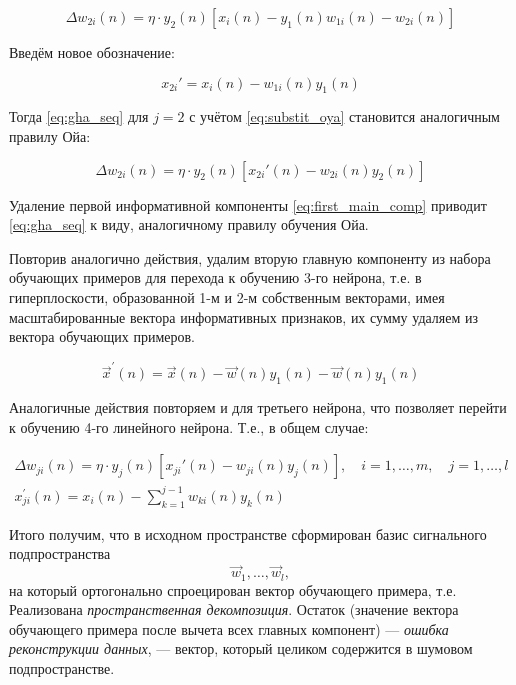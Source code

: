 \documentclass[a4paper]{article}
\numberwithin{equation}{subsection}
\begin{document}
\begin{equation}
    \Delta w_{2i}(n) = \eta \cdot y_2(n) \left[
        x_i(n) - y_1(n) w_{1i}(n) - w_{2i}(n)
    \right]
\end{equation}

Введём новое обозначение:

\begin{equation}
    x_{2i}' = x_i(n) - w_{1i}(n) y_1(n)
    \label{eq:substit_oya}
\end{equation}

Тогда \ref{eq:gha_seq} для $j=2$ с учётом \ref{eq:substit_oya} становится аналогичным правилу Ойа:

\begin{equation}
    \Delta w_{2i}(n) = \eta \cdot y_2(n) 
    \left[
        x_{2i}'(n) - w_{2i}(n) y_2(n)
    \right]
\end{equation}

Удаление первой информативной компоненты \ref{eq:first_main_comp} приводит \ref{eq:gha_seq} 
к виду, аналогичному правилу обучения Ойа.

Повторив аналогично действия, удалим вторую главную компоненту из набора обучающих примеров 
для перехода к обучению 3-го нейрона, т.е. в гиперплоскости, образованной 1-м и 2-м собственным 
векторами, имея масштабированные вектора информативных признаков, их сумму удаляем из вектора 
обучающих примеров.

\begin{equation}
    \vec{x}^\prime(n) = \vec{x}(n) - \vec{w}(n) y_1(n) - \vec{w}(n) y_1(n) 
\end{equation}

Аналогичные действия повторяем и для третьего нейрона, что позволяет перейти к обучению 4-го
линейного нейрона. Т.е., в общем случае:

\begin{align}
    \Delta w_{ji}(n) = \eta \cdot y_j(n) 
    \left[
        x_{ji}'(n) - w_{ji}(n) y_j(n)
    \right], \quad i = 1, \dots, m,\quad j=1, \dots, l \\
    x_{ji}^\prime (n) = x_i(n) - \sum_{k=1}^{j-1} w_{ki} (n) y_k (n)
\end{align}

Итого получим, что в исходном пространстве сформирован базис сигнального подпространства
\begin{equation*}
    \vec{w}_1, \dots, \vec{w}_l,
\end{equation*}
\noindent
на который ортогонально спроецирован вектор обучающего примера, т.е. Реализована 
\textit{пространственная декомпозиция}.
Остаток (значение вектора обучающего примера после вычета всех главных компонент)
--- \textit{ошибка реконструкции данных}, --- вектор, который целиком содержится 
в шумовом подпространстве.
\end{document}
